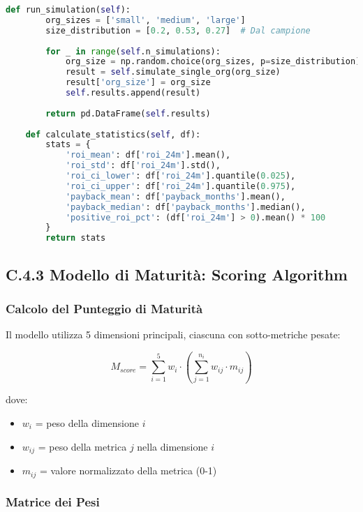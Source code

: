 \begin{lstlisting}[language=Python, caption=Simulazione Monte Carlo per ROI Compliance]
    def run_simulation(self):
        org_sizes = ['small', 'medium', 'large']
        size_distribution = [0.2, 0.53, 0.27]  # Dal campione
        
        for _ in range(self.n_simulations):
            org_size = np.random.choice(org_sizes, p=size_distribution)
            result = self.simulate_single_org(org_size)
            result['org_size'] = org_size
            self.results.append(result)
        
        return pd.DataFrame(self.results)
    
    def calculate_statistics(self, df):
        stats = {
            'roi_mean': df['roi_24m'].mean(),
            'roi_std': df['roi_24m'].std(),
            'roi_ci_lower': df['roi_24m'].quantile(0.025),
            'roi_ci_upper': df['roi_24m'].quantile(0.975),
            'payback_mean': df['payback_months'].mean(),
            'payback_median': df['payback_months'].median(),
            'positive_roi_pct': (df['roi_24m'] > 0).mean() * 100
        }
        return stats
\end{lstlisting}

\subsection{\texorpdfstring{\textbf{C.4.3 Modello di Maturità: Scoring Algorithm}}{C.4.3 - Modello di Maturità: Scoring Algorithm}}

\subsubsection{Calcolo del Punteggio di Maturità}

Il modello utilizza 5 dimensioni principali, ciascuna con sotto-metriche pesate:

\begin{equation}
M_{score} = \sum_{i=1}^{5} w_i \cdot \left(\sum_{j=1}^{n_i} w_{ij} \cdot m_{ij}\right)
\end{equation}

dove:
\begin{itemize}
    \item $w_i$ = peso della dimensione $i$
    \item $w_{ij}$ = peso della metrica $j$ nella dimensione $i$
    \item $m_{ij}$ = valore normalizzato della metrica (0-1)
\end{itemize}

\subsubsection{Matrice dei Pesi}

